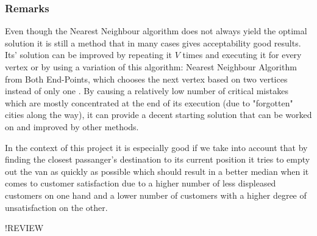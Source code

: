 \subsubsection{Remarks}
Even though the Nearest Neighbour algorithm does not always yield the optimal solution it is still a method that in many cases gives acceptability good results.
Its' solution can be improved by repeating it $V$ times and executing it for every vertex or by using a variation of this algorithm: Nearest Neighbour Algorithm from Both End-Points, which chooses the next vertex based on two vertices instead of only one \cite{NN-algorithm}.
By causing a relatively low number of critical mistakes which are mostly concentrated at the end of its execution (due to "forgotten" cities along the way), it can provide a decent starting solution that can be worked on and improved by other methods.\par
In the context of this project it is especially good if we take into account that by finding the closest passanger's destination to its current position it tries to empty out the van as quickly as possible
which should result in a better median when it comes to customer satisfaction due to a higher number of less displeased customers on one hand and a lower number of customers with a higher degree of unsatisfaction on the other.
\par
!REVIEW